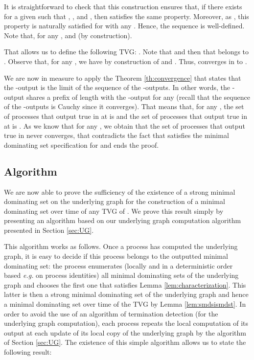 \documentclass{article}
\newenvironment{proof}{{\bf Proof. } }{{\hfill }}
\begin{document}
\begin{proof}
It is straightforward to check that this construction ensures that, if there exists  for a given  such that , , and , then  satisfies the same property. Moreover, as , this property is naturally satisfied for  with any . Hence, the sequence  is well-defined. Note that, for any ,  and  (by construction). 

That allows us to define the following TVG: . Note that  and then that  belongs to . Observe that, for any , we have  by construction of  and . Thus,  converges in  to .

We are now in measure to apply the Theorem \ref{th:convergence} that states that the -output is the limit of the sequence of the -outputs. In other words, the -output shares a prefix of length  with the -output for any  (recall that the sequence of the -outputs is Cauchy since it converges). That means that, for any , the set of processes that output true in  at  is  and the set of processes that output true in  at  is . As we know that  for any , we obtain that the set of processes that output true in  never converges, that contradicts the fact that  satisfies the minimal dominating set specification for  and ends the proof.
\end{proof}

\subsection{Algorithm}\label{sub:MDSalgo}

We are now able to prove the sufficiency of the existence of a strong minimal dominating set on the underlying graph for the construction of a minimal dominating set over time of any TVG of . We prove this result simply by presenting an algorithm based on our underlying graph computation algorithm presented in Section \ref{sec:UG}. 

This algorithm works as follows. Once a process has computed the underlying graph, it is easy to decide if this process belongs to the outputted minimal dominating set: the process enumerates (locally and in a deterministic order based \emph{e.g.} on process identities) all minimal dominating sets of the underlying graph and chooses the first one that satisfies Lemma \ref{lem:characterization}. This latter is then a strong minimal dominating set of the underlying graph and hence a minimal dominating set over time of the TVG by Lemma \ref{lem:smdsismdst}. In order to avoid the use of an algorithm of termination detection (for the underlying graph computation), each process repeats the local computation of its output at each update of its local copy of the underlying graph by the algorithm of Section \ref{sec:UG}. The existence of this simple algorithm allows us to state the following result:
\end{document}
